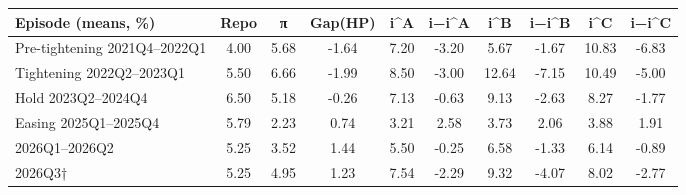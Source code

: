 \begin{tabular}{lccccccccc}
\toprule
Episode (means, \%) & Repo & π & Gap(HP) & i^A & i−i^A & i^B & i−i^B & i^C & i−i^C \\
\midrule
Pre-tightening 2021Q4–2022Q1 & 4.00 & 5.68 & -1.64 & 7.20 & -3.20 & 5.67 & -1.67 & 10.83 & -6.83 \\
Tightening 2022Q2–2023Q1 & 5.50 & 6.66 & -1.99 & 8.50 & -3.00 & 12.64 & -7.15 & 10.49 & -5.00 \\
Hold 2023Q2–2024Q4 & 6.50 & 5.18 & -0.26 & 7.13 & -0.63 & 9.13 & -2.63 & 8.27 & -1.77 \\
Easing 2025Q1–2025Q4 & 5.79 & 2.23 & 0.74 & 3.21 & 2.58 & 3.73 & 2.06 & 3.88 & 1.91 \\
2026Q1–2026Q2 & 5.25 & 3.52 & 1.44 & 5.50 & -0.25 & 6.58 & -1.33 & 6.14 & -0.89 \\
2026Q3† & 5.25 & 4.95 & 1.23 & 7.54 & -2.29 & 9.32 & -4.07 & 8.02 & -2.77 \\
\bottomrule
\end{tabular}
